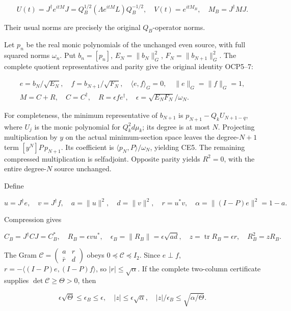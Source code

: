\documentclass[10pt]{article}
\begin{document}
\[
U(t)=J^\dagger e^{itM}J=Q_B^{1/2}(\Lambda e^{itM}L)Q_B^{-1/2},\quad
V(t)=e^{itM_B},\quad M_B=J^\dagger MJ. \tag{CE4}
\]

Their usual norms are precisely the original \(Q_B\)-operator norms.

Let \(p_n\) be the real monic polynomials of the unchanged even source, with full squared norms \(\omega_n\). Put \(b_n=[p_n]\), \(E_N=\|b_N\|_G^2\), \(F_N=\|b_{N+1}\|_G^2\). The complete quotient representatives and parity give the original identity OCP5--7:

\[
\begin{gathered}
e=b_N/\sqrt{E_N},\quad f=b_{N+1}/\sqrt{F_N},\quad
\langle e,f\rangle_G=0,\quad \|e\|_G=\|f\|_G=1,\\
M=C+R,\quad C=C^\dagger,\quad R=\epsilon f e^\dagger,
\quad \epsilon=\sqrt{E_NF_N}/\omega_N.
\end{gathered}\tag{CE5}
\]

For completeness, the minimum representative of \(b_{N+1}\) is \(p_{N+1}-Q_k U_{N+1-q}\), where \(U_j\) is the monic polynomial for \(Q_k^2d\mu_k\); its degree is at most \(N\). Projecting multiplication by \(y\) on the actual minimum-section space leaves the degree-\(N+1\) term \([y^N]P\,p_{N+1}\). Its coefficient is \(\langle p_N,P\rangle/\omega_N\), yielding CE5. The remaining compressed multiplication is selfadjoint. Opposite parity yields \(R^2=0\), with the entire degree-\(N\) source unchanged.

Define

\[
u=J^\dagger e,\quad v=J^\dagger f,\quad
a=\|u\|^2,\quad d=\|v\|^2,\quad r=u^*v,\quad
\alpha=\|(I-P)e\|^2=1-a. \tag{CE6}
\]

Compression gives

\[
C_B=J^\dagger CJ=C_B^*,\quad R_B=\epsilon vu^*,\quad
\epsilon_B=\|R_B\|=\epsilon\sqrt{ad},\quad z=\operatorname{tr}R_B=\epsilon r,
\quad R_B^2=zR_B. \tag{CE7}
\]

The Gram \(\mathcal C=\begin{pmatrix}a&r\\\bar r&d\end{pmatrix}\) obeys \(0\preceq\mathcal C\preceq I_2\). Since \(e\perp f\), \(r=-\langle(I-P)e,(I-P)f\rangle\), so \(|r|\le\sqrt\alpha\). If the complete two-column certificate supplies \(\det\mathcal C\ge\Theta>0\), then

\[
\epsilon\sqrt\Theta\le\epsilon_B\le\epsilon,
\quad |z|\le\epsilon\sqrt\alpha,
\quad |z|/\epsilon_B\le\sqrt{\alpha/\Theta}. \tag{CE8}
\]
\end{document}
